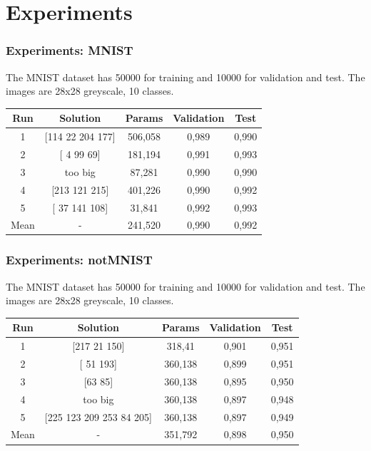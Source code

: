 \documentclass[aspectratio=169]{beamer}
\begin{document}
	\section{Experiments}
		\begin{frame}
			\frametitle{Experiments: MNIST}

			The MNIST dataset has 50000 for training and 10000 for validation and test. The images are 28x28 greyscale, 10 classes.
			
			\begin{table}
				\begin{tabular}{c|c|c|c|c}
					\hline
					Run  &     Solution      & Params & Validation & Test  \\ \hline
					 1   & [114  22 204 177] & 506,058 &   0,989    & 0,990 \\
					 2   &    [ 4 99 69]     & 181,194 &   0,991    & 0,993 \\
					 3   &      too big      & 87,281  &   0,990    & 0,990 \\
					 4   &   [213 121 215]   & 401,226 &   0,990    & 0,992 \\
					 5   &   [ 37 141 108]   & 31,841  &   0,992    & 0,993 \\
					Mean &         -         & 241,520 &   0,990    & 0,992 \\ \hline
				\end{tabular}
			\end{table}

		\end{frame}
		\begin{frame}
			\frametitle{Experiments: notMNIST}
			
			The MNIST dataset has 50000 for training and 10000 for validation and test. The images are 28x28 greyscale, 10 classes.
			
			\begin{table}
				\begin{tabular}{c|c|c|c|c}
					\hline
					Run  &         Solution          & Params  & Validation & Test   \\ \hline
					 1   &       [217  21 150]       & 318,41  &   0,901    & 0,951  \\
					 2   &         [ 51 193]         & 360,138 &   0,899    & 0,951  \\
					 3   &          [63 85]          & 360,138 &   0,895    & 0,950  \\
					 4   &          too big          & 360,138 &   0,897    & 0,948  \\
					 5   & [225 123 209 253  84 205] & 360,138 &   0,897    & 0,949  \\
					Mean &             -             & 351,792 &   0,898    & 0,950  \\ \hline
				\end{tabular}
			\end{table}
		
		\end{frame}
\end{document}
